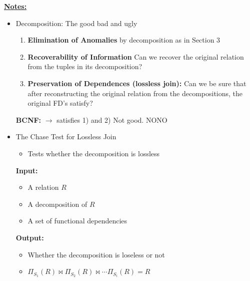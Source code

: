 \documentclass[12pt]{article}
\begin{document}
\begin{enumerate}[1.]
\begin{enumerate}[a)]
\begin{itemize}
        \end{itemize}

        \bigskip

        \underline{\textbf{Notes:}}

        \bigskip

        \begin{itemize}
            \item Decomposition: The good bad and ugly

            \begin{enumerate}[1)]
                \item \textbf{Elimination of Anomalies} by decomposition as in Section 3
                \item \textbf{Recoverability of Information} Can we recover the original relation
                from the tuples in its decomposition?
                \item \textbf{Preservation of Dependences (lossless join):} Can we be sure that after reconstructing the original relation
                from the decompositions, the original FD's satisfy?
            \end{enumerate}

            \bigskip

            \textbf{BCNF:} $\to$ satisfies 1) and 2) \color{red}Not good. NONO\color{black}


            \item The Chase Test for Lossless Join
            \begin{itemize}
                \item Tests whether the decomposition is lossless
            \end{itemize}

            \bigskip

            \textbf{Input:}

            \begin{itemize}
                \item A relation $R$
                \item A decomposition of $R$
                \item A set of functional dependencies
            \end{itemize}

            \bigskip

            \textbf{Output:}

            \begin{itemize}
                \item Whether the decomposition is loseless or not
                \item $\Pi_{S_1}(R) \bowtie \Pi_{S_2}(R) \bowtie \cdots \Pi_{S_i}(R) = R$
            \end{itemize}


\end{itemize}
\end{enumerate}
\end{enumerate}
\end{document}

